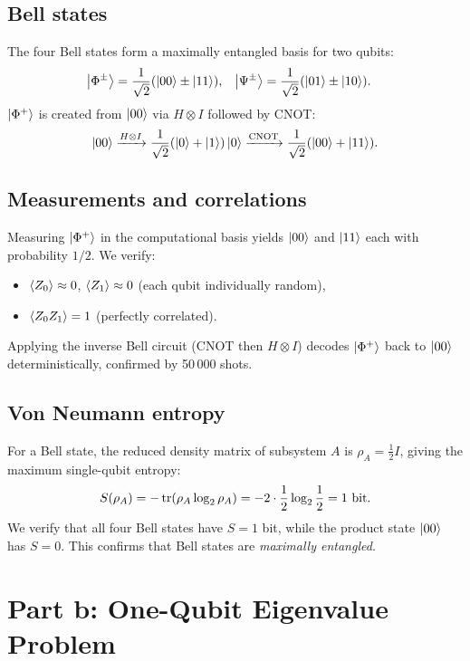 \documentclass[11pt]{article}
\begin{document}
\subsection{Bell states}

The four Bell states form a maximally entangled basis for two qubits:
\begin{align}
\ket{\Phi^\pm} &= \frac{1}{\sqrt{2}}(\ket{00} \pm \ket{11}), &
\ket{\Psi^\pm} &= \frac{1}{\sqrt{2}}(\ket{01} \pm \ket{10}).
\end{align}
$\ket{\Phi^+}$ is created from $\ket{00}$ via $H \otimes I$ followed by CNOT:
\[
\ket{00} \xrightarrow{H \otimes I} \frac{1}{\sqrt{2}}(\ket{0}+\ket{1})\ket{0} \xrightarrow{\text{CNOT}} \frac{1}{\sqrt{2}}(\ket{00}+\ket{11}).
\]

\subsection{Measurements and correlations}

Measuring $\ket{\Phi^+}$ in the computational basis yields $\ket{00}$ and $\ket{11}$ each with probability $1/2$. We verify:
\begin{itemize}[nosep]
  \item $\expval{Z_0} \approx 0$, $\expval{Z_1} \approx 0$ (each qubit individually random),
  \item $\expval{Z_0 Z_1} = 1$ (perfectly correlated).
\end{itemize}
Applying the inverse Bell circuit (CNOT then $H \otimes I$) decodes $\ket{\Phi^+}$ back to $\ket{00}$ deterministically, confirmed by 50\,000 shots.

\subsection{Von Neumann entropy}

For a Bell state, the reduced density matrix of subsystem $A$ is $\rho_A = \frac{1}{2}I$, giving the maximum single-qubit entropy:
\[
S(\rho_A) = -\tr(\rho_A \log_2 \rho_A) = -2 \cdot \frac{1}{2}\log_2 \frac{1}{2} = 1~\text{bit}.
\]
We verify that all four Bell states have $S = 1$ bit, while the product state $\ket{00}$ has $S = 0$. This confirms that Bell states are \emph{maximally entangled}.

\section{Part b: One-Qubit Eigenvalue Problem}
\end{document}
